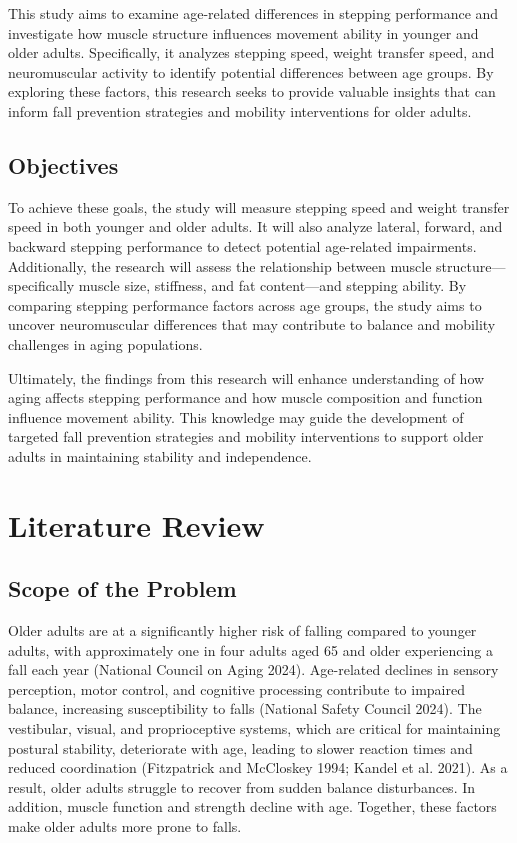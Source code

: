 \documentclass[
  letterpaper,
  DIV=11,
  numbers=noendperiod]{scrartcl}
\begin{document}
This study aims to examine age-related differences in stepping
performance and investigate how muscle structure influences movement
ability in younger and older adults. Specifically, it analyzes stepping
speed, weight transfer speed, and neuromuscular activity to identify
potential differences between age groups. By exploring these factors,
this research seeks to provide valuable insights that can inform fall
prevention strategies and mobility interventions for older adults.

\subsection{Objectives}\label{objectives}

To achieve these goals, the study will measure stepping speed and weight
transfer speed in both younger and older adults. It will also analyze
lateral, forward, and backward stepping performance to detect potential
age-related impairments. Additionally, the research will assess the
relationship between muscle structure---specifically muscle size,
stiffness, and fat content---and stepping ability. By comparing stepping
performance factors across age groups, the study aims to uncover
neuromuscular differences that may contribute to balance and mobility
challenges in aging populations.

Ultimately, the findings from this research will enhance understanding
of how aging affects stepping performance and how muscle composition and
function influence movement ability. This knowledge may guide the
development of targeted fall prevention strategies and mobility
interventions to support older adults in maintaining stability and
independence.

\section{Literature Review}\label{literature-review}

\subsection{Scope of the Problem}\label{scope-of-the-problem}

Older adults are at a significantly higher risk of falling compared to
younger adults, with approximately one in four adults aged 65 and older
experiencing a fall each year (National Council on Aging 2024).
Age-related declines in sensory perception, motor control, and cognitive
processing contribute to impaired balance, increasing susceptibility to
falls (National Safety Council 2024). The vestibular, visual, and
proprioceptive systems, which are critical for maintaining postural
stability, deteriorate with age, leading to slower reaction times and
reduced coordination (Fitzpatrick and McCloskey 1994; Kandel et al.
2021). As a result, older adults struggle to recover from sudden balance
disturbances. In addition, muscle function and strength decline with
age. Together, these factors make older adults more prone to falls.
\end{document}
